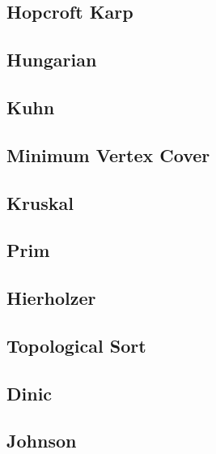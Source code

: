 \subsection{Hopcroft Karp}
\raggedbottom
\hrulefill
\subsection{Hungarian}
\raggedbottom
\hrulefill
\subsection{Kuhn}
\raggedbottom
\hrulefill
\subsection{Minimum Vertex Cover}
\raggedbottom
\hrulefill
\subsection{Kruskal}
\raggedbottom
\hrulefill
\subsection{Prim}
\raggedbottom
\hrulefill
\subsection{Hierholzer}
\raggedbottom
\hrulefill
\subsection{Topological Sort}
\raggedbottom
\hrulefill
\subsection{Dinic}
\raggedbottom
\hrulefill
\subsection{Johnson}
\raggedbottom
\hrulefill
